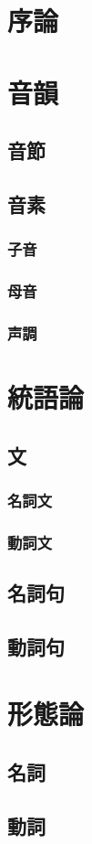 \section{序論}
\newpage

\section{音韻}
\subsection{音節}
\subsection{音素}
\subsubsection{子音}
\subsubsection{母音}
\subsubsection{声調}
\newpage

\section{統語論}
\subsection{文}
\subsubsection{名詞文}
\subsubsection{動詞文}
\subsection{名詞句}
\subsection{動詞句}

\section{形態論}
\subsection{名詞}
\subsection{動詞}
